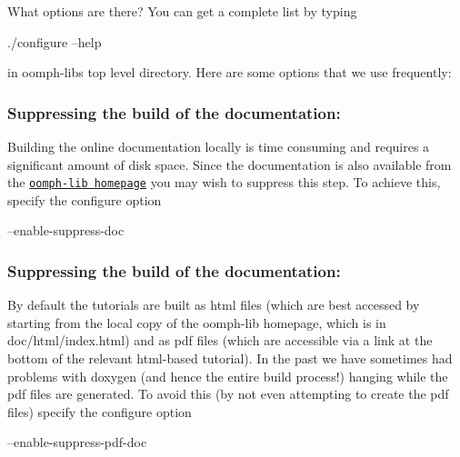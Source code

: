 What options are there? You can get a complete list by typing \begin{DoxyVerb}./configure --help
\end{DoxyVerb}


in {\ttfamily oomph-\/lib}\textquotesingle{}s top level directory. Here are some options that we use frequently\+:\hypertarget{index_no_doc}{}\subsubsection{Suppressing the build of the documentation\+:}\label{index_no_doc}
Building the online documentation locally is time consuming and requires a significant amount of disk space. Since the documentation is also available from the \href{http://www.oomph-lib.org}{\tt oomph-\/lib homepage} you may wish to suppress this step. To achieve this, specify the configure option \begin{DoxyVerb}--enable-suppress-doc
\end{DoxyVerb}
\hypertarget{index_no_doc}{}\subsubsection{Suppressing the build of the documentation\+:}\label{index_no_doc}
By default the tutorials are built as html files (which are best accessed by starting from the local copy of the {\ttfamily oomph-\/lib} homepage, which is in {\ttfamily doc/html/index.\+html}) and as pdf files (which are accessible via a link at the bottom of the relevant html-\/based tutorial). In the past we have sometimes had problems with {\ttfamily doxygen} (and hence the entire build process!) hanging while the pdf files are generated. To avoid this (by not even attempting to create the pdf files) specify the configure option \begin{DoxyVerb}--enable-suppress-pdf-doc
\end{DoxyVerb}


